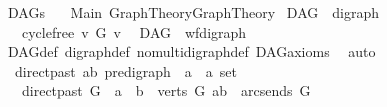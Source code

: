 %
\begin{isabellebody}%
%
%
\isadelimtheory
\isanewline
\isanewline
\isanewline
%
\endisadelimtheory
%
\isatagtheory
{}\isamarkupfalse%
\ DAGs\isanewline
\ \ \ Main\ {\isachardoublequoteopen}Graph{\isacharunderscore}{\kern0pt}Theory{\isachardot}{\kern0pt}Graph{\isacharunderscore}{\kern0pt}Theory{\isachardoublequoteclose}\isanewline
{}%
\endisatagtheory
{\isafoldtheory}%
%
\isadelimtheory
%
\endisadelimtheory
%
\isadelimdocument
%
\endisadelimdocument
%
\isatagdocument
%
\isamarkuptrue%
%
\endisatagdocument
{\isafolddocument}%
%
\isadelimdocument
%
\endisadelimdocument
{}\isamarkupfalse%
\ DAG\ {\isacharequal}{\kern0pt}\ digraph\ {\isacharplus}{\kern0pt}\isanewline
\ \ \ cycle{\isacharunderscore}{\kern0pt}free{\isacharcolon}{\kern0pt}\ {\isachardoublequoteopen}{\isasymnot}{\isacharparenleft}{\kern0pt}v\ {\isasymrightarrow}\isactrlsup {\isacharplus}{\kern0pt}\isactrlbsub G\isactrlesub \ v{\isacharparenright}{\kern0pt}{\isachardoublequoteclose}\ \isanewline
\isanewline
{}\isamarkupfalse%
\ DAG\ {\isasymsubseteq}\ wf{\isacharunderscore}{\kern0pt}digraph%
\isadelimproof
\ %
\endisadelimproof
%
\isatagproof
{}\isamarkupfalse%
\ DAG{\isacharunderscore}{\kern0pt}def\ digraph{\isacharunderscore}{\kern0pt}def\ nomulti{\isacharunderscore}{\kern0pt}digraph{\isacharunderscore}{\kern0pt}def\ DAG{\isacharunderscore}{\kern0pt}axioms\ \isamarkupfalse%
\ auto%
\endisatagproof
{\isafoldproof}%
%
\isadelimproof
%
\endisadelimproof
%
\isadelimdocument
%
\endisadelimdocument
%
\isatagdocument
%
\isamarkuptrue%
%
\endisatagdocument
{\isafolddocument}%
%
\isadelimdocument
%
\endisadelimdocument
{}\isamarkupfalse%
\ \ direct{\isacharunderscore}{\kern0pt}past{\isacharcolon}{\kern0pt}{\isacharcolon}{\kern0pt}\ {\isachardoublequoteopen}{\isacharparenleft}{\kern0pt}{\isacharprime}{\kern0pt}a{\isacharcomma}{\kern0pt}{\isacharprime}{\kern0pt}b{\isacharparenright}{\kern0pt}\ pre{\isacharunderscore}{\kern0pt}digraph\ {\isasymRightarrow}\ {\isacharprime}{\kern0pt}a\ {\isasymRightarrow}\ {\isacharprime}{\kern0pt}a\ set{\isachardoublequoteclose}\isanewline
\ \ \ {\isachardoublequoteopen}direct{\isacharunderscore}{\kern0pt}past\ G\ \ a\ {\isacharequal}{\kern0pt}\ {\isacharbraceleft}{\kern0pt}b\ {\isasymin}\ verts\ G{\isachardot}{\kern0pt}\ {\isacharparenleft}{\kern0pt}a{\isacharcomma}{\kern0pt}b{\isacharparenright}{\kern0pt}\ {\isasymin}\ arcs{\isacharunderscore}{\kern0pt}ends\ G{\isacharbraceright}{\kern0pt}{\isachardoublequoteclose}\isanewline

\end{isabellebody}
